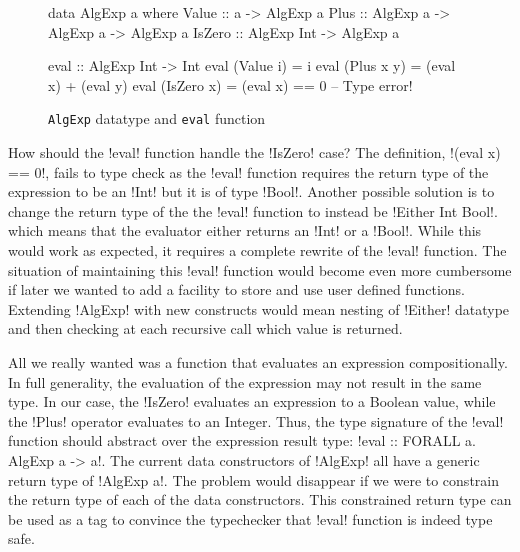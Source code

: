 \documentclass[manuscript,screen,nonacm]{acmart}
\begin{document}
\begin{figure}[ht]
\centering
\begin{minipage}[ht]{0.6\linewidth}
\begin{code}
data AlgExp a where
  Value  :: a                    -> AlgExp a
  Plus   :: AlgExp a -> AlgExp a -> AlgExp a
  IsZero :: AlgExp Int           -> AlgExp a
\end{code}
\end{minipage}%
\begin{minipage}[ht]{0.4\linewidth}
\begin{code}
eval :: AlgExp Int -> Int
eval (Value i) = i
eval (Plus x y) = (eval x) + (eval y)
eval (IsZero x) = (eval x) == 0 -- Type error!
\end{code}
\end{minipage}
\caption{\texttt{AlgExp} datatype and \texttt{eval} function}
\label{fig:algexp-eval}
\end{figure}
How should the !eval! function handle the !IsZero! case? The definition, !(eval x) == 0!, fails to type check as the !eval! function requires the return type of the expression to be an !Int! but it is of type !Bool!. Another possible solution is to change the return type of the the !eval! function to instead be !Either Int Bool!. which means that the evaluator either returns an !Int! or a !Bool!. While this would work as expected, it requires a complete rewrite of the !eval! function. The situation of maintaining this !eval! function would become even more cumbersome if later we wanted to add a facility to store and use user defined functions. Extending !AlgExp! with new constructs would mean nesting of !Either! datatype and then checking at each recursive call which value is returned.

All we really wanted was a function that evaluates an expression compositionally. In full generality, the evaluation of the expression may not result in the same type. In our case, the !IsZero! evaluates an expression to a Boolean value, while the !Plus! operator evaluates to an Integer. Thus, the type signature of the !eval! function should abstract over the expression result type: !eval :: FORALL a. AlgExp a -> a!. The current data constructors of !AlgExp! all have a generic return type of !AlgExp a!. The problem would disappear if we were to constrain the return type of each of the data constructors. This constrained return type can be used as a tag to convince the typechecker that !eval! function is indeed type safe.
\end{document}
